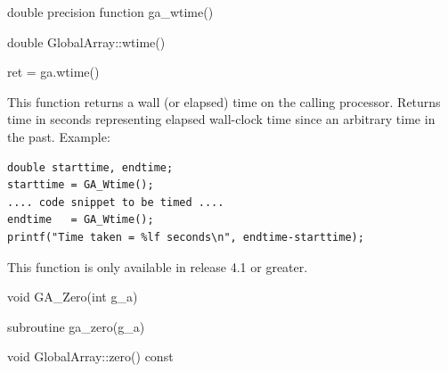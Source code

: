 \documentclass[12pt]{article}
\begin{document}
\begin{fapi}
\begin{fcode}
double precision function ga_wtime()
\end{fcode}
\end{fapi}

\begin{cxxapi}
\begin{cxxcode}
double GlobalArray::wtime()
\end{cxxcode}
\end{cxxapi}

\begin{pyapi}
\begin{pycode}
ret = ga.wtime()
\end{pycode}
\end{pyapi}

\local

\begin{desc}
This function returns a wall (or elapsed) time on the calling processor.
Returns time in seconds representing elapsed wall-clock time since an arbitrary
time in the past. Example:
\begin{verbatim}
double starttime, endtime;
starttime = GA_Wtime();
.... code snippet to be timed ....
endtime   = GA_Wtime();
printf("Time taken = %lf seconds\n", endtime-starttime);
\end{verbatim}
This function is only available in release 4.1 or greater.
\end{desc}


\begin{capi}
\begin{ccode}
void GA_Zero(int g_a)
\end{ccode}
\begin{funcargs}
\end{funcargs}
\end{capi}

\begin{fapi}
\begin{fcode}
subroutine ga_zero(g_a)
\end{fcode}
\begin{funcargs}
\end{funcargs}
\end{fapi}

\begin{cxxapi}
\begin{cxxcode}
void GlobalArray::zero() const
\end{cxxcode}
\end{cxxapi}
\end{document}

